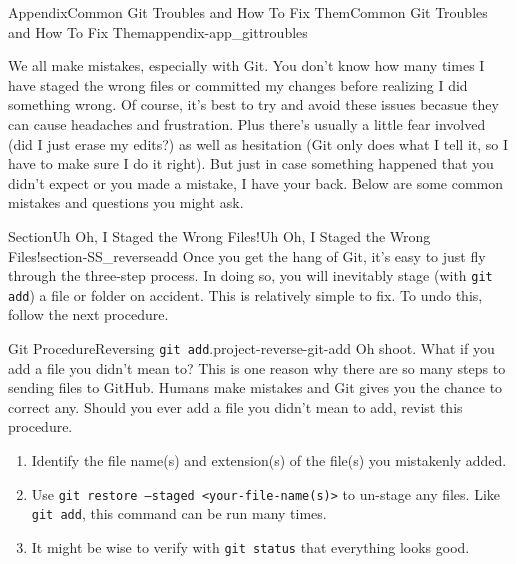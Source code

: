 \documentclass[twoside,10pt,]{book}
\newcommand{\mono}[1]{\texttt{#1}}
\begin{document}
\begin{appendixptx}{Appendix}{Common Git Troubles and How To Fix Them}{}{Common Git Troubles and How To Fix Them}{}{}{appendix-app_gittroubles}
\renewcommand*{\appendixname}{Appendix}
%
\begin{introduction}{}%
We all make mistakes, especially with Git. You don't know how many times I have staged the wrong files or committed my changes before realizing I did something wrong. Of course, it's best to try and avoid these issues becasue they can cause headaches and frustration. Plus there's usually a little fear involved (did I just erase my edits?) as well as hesitation (Git only does what I tell it, so I have to make sure I do it right). But just in case something happened that you didn't expect or you made a mistake, I have your back. Below are some common mistakes and questions you might ask.%
\end{introduction}%
%
%
\typeout{************************************************}
\typeout{************************************************}
%
\begin{sectionptx}{Section}{Uh Oh, I Staged the Wrong Files!}{}{Uh Oh, I Staged the Wrong Files!}{}{}{section-SS_reverseadd}
%
%
Once you get the hang of Git, it's easy to just fly through the three-step process. In doing so, you will inevitably stage (with \mono{git add}) a file or folder on accident. This is relatively simple to fix. To undo this, follow the next procedure.%
\begin{project}{Git Procedure}{Reversing \mono{git add}.}{project-reverse-git-add}%
Oh shoot. What if you add a file you didn't mean to? This is one reason why there are so many steps to sending files to GitHub. Humans make mistakes and Git gives you the chance to correct any. Should you ever add a file you didn't mean to add, revist this procedure.%
\begin{enumerate}[font=\bfseries,label=(\alph*),ref=\alph*]%
\item{}Identify the file name(s) and extension(s) of the file(s) you mistakenly added.%
\item{}Use \mono{git restore --staged <your-file-name(s)>} to un-stage any files. Like \mono{git add}, this command can be run many times.%
\item{}It might be wise to verify with \mono{git status} that everything looks good.%
\end{enumerate}%
\end{project}%

\end{sectionptx}
\end{appendixptx}
\end{document}
